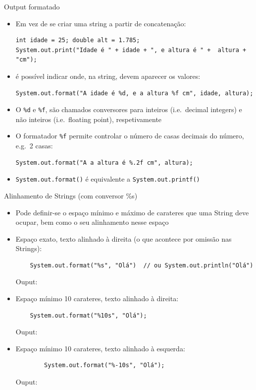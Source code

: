 \documentclass[portuguese, aspectratio=169, xcolor=table]{beamer}
\begin{document}
\begin{frame}[fragile]{Output formatado}
\begin{itemize}
    \item Em vez de se criar uma string a partir de concatenação:
\begin{verbatim}
int idade = 25; double alt = 1.785;
System.out.print("Idade é " + idade + ", e altura é " +  altura + "cm");
\end{verbatim}
\item é possível indicar onde, na string, devem aparecer os valores:
\begin{verbatim}
System.out.format("A idade é %d, e a altura %f cm", idade, altura);
\end{verbatim}
        
\item O \texttt{\%d} e \texttt{\%f}, são chamados conversores para inteiros (i.e.\ decimal integers) e não inteiros (i.e.\ floating point), respetivamente

\item O formatador \texttt{\%f} permite controlar o número de casas decimais do número, e.g.\ 2 casas:
\begin{verbatim}
System.out.format("A a altura é %.2f cm", altura);
\end{verbatim}

\item \texttt{System.out.format()} é equivalente a \texttt{System.out.printf()}
\end{itemize}
\end{frame}


\begin{frame}[fragile]{Alinhamento de Strings (com conversor {\color{red}\%s})}
\begin{itemize}
    \item Pode definir-se o espaço mínimo e máximo de carateres que uma String deve ocupar, bem como o seu alinhamento nesse espaço
    \item Espaço exato, texto alinhado à direita (o que acontece por omissão nas Strings):
    \begin{verbatim}
    System.out.format("%s", "Olá")  // ou System.out.println("Olá")
    \end{verbatim}
    Ouput: 
    \item Espaço mínimo 10 carateres, texto alinhado à direita:
    \begin{verbatim}
    System.out.format("%10s", "Olá");
    \end{verbatim}
    Ouput: 
    \item Espaço mínimo 10 carateres, texto alinhado à esquerda:
    \begin{verbatim}
        System.out.format("%-10s", "Olá");
    \end{verbatim}
    Ouput: 
\end{itemize}
\end{frame}
\end{document}
